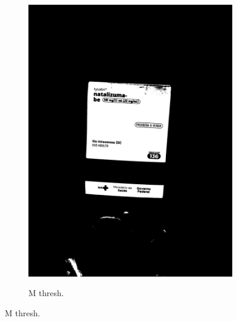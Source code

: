 \begin{figure}[htb]
\begin{subfigure}[t]{0.21\textwidth}
        \includegraphics[width=\linewidth]{../pictures/tysabri_cmyk_c_only_thresh.jpg}
    \end{subfigure}
    \hfill
    \begin{subfigure}[t]{0.21\textwidth}
        \centering
        \caption{M thresh.}
        \label{fig:foto:versoes:2:M_thresh}

\end{subfigure}
\end{figure}
